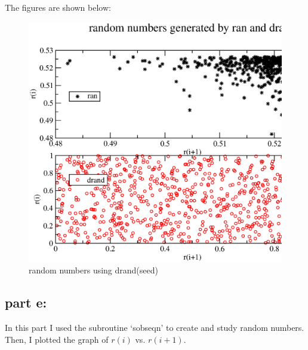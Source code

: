 \documentclass[11pt,a4paper,english]{article}
\begin{document}
    	
	    The figures are shown below:\\
	\begin{figure}[h!]
	\centering
	\includegraphics [scale=0.6]{figures/hw8qn1d.eps}
	\caption{random numbers using drand(seed) }
	\end{figure}
	\clearpage
	
	\subsection{part e: }
    In this part I used the subroutine `sobseqn' to create and study random numbers.
    Then, I plotted the graph of $r(i)$ vs. $r(i+1)$.
    
\end{document}
